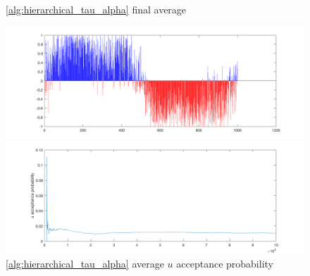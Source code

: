 \documentclass{siamart1116}
\begin{document}
    \begin{figure}[!htb]
        \begin{minipage}{0.48\textwidth}
            \centering
            \caption{\label{fig:moon_centered_avg} \cref{alg:hierarchical_tau_alpha} final average}
            \includegraphics[width=\linewidth]{graphics/moons/centered/final_avg.png}
        \end{minipage} \hfill
        \begin{minipage}{0.48\textwidth}
            \centering
            \caption{\label{fig:moon_centered_accept} \cref{alg:hierarchical_tau_alpha} average $u$ acceptance probability}
            \includegraphics[width=\linewidth]{graphics/moons/centered/acceptance_u_probability.png}
        \end{minipage}
    \end{figure}
\end{document}
